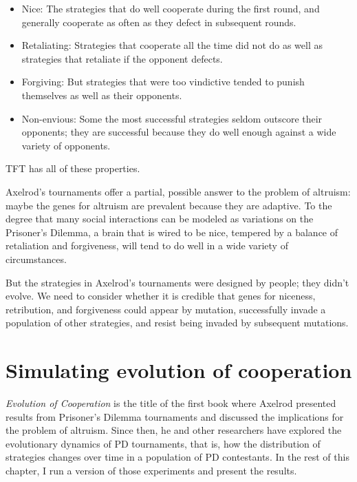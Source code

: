 \documentclass[12pt]{book}
\theoremstyle{exercise}
\begin{document}
\begin{itemize}

\item Nice: The strategies that do well cooperate during the first round, and generally cooperate as often as they defect in subsequent rounds.

\item Retaliating: Strategies that cooperate all the time did not do as well as strategies that retaliate if the opponent defects.

\item Forgiving: But strategies that were too vindictive tended to punish themselves as well as their opponents.

\item Non-envious: Some the most successful strategies seldom outscore their opponents; they are successful because they do well enough against a wide variety of opponents.

\end{itemize}

TFT has all of these properties.

Axelrod's tournaments offer a partial, possible answer to the problem of altruism: maybe the genes for altruism are prevalent because they are adaptive.  To the degree that many social interactions can be modeled as variations on the Prisoner's Dilemma, a brain that is wired to be nice, tempered by a balance of retaliation and forgiveness, will tend to do well in a wide variety of circumstances.

But the strategies in Axelrod's tournaments were designed by people; they didn't evolve.  We need to consider whether it is credible that genes for niceness, retribution, and forgiveness could appear by mutation, successfully invade a population of other strategies, and resist being invaded by subsequent mutations.


\section{Simulating evolution of cooperation}

{\em Evolution of Cooperation} is the title of the first book where Axelrod presented results from Prisoner's Dilemma tournaments and discussed the implications for the problem of altruism.  Since then, he and other researchers have explored the evolutionary dynamics of PD tournaments, that is, how the distribution of strategies changes over time in a population of PD contestants.    In the rest of this chapter, I run a version of those experiments and present the results.
\end{document}
